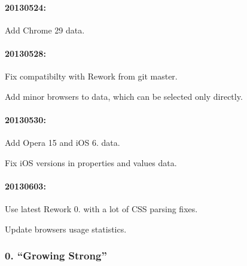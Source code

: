 \paragraph*{20130524\+:}


\begin{DoxyItemize}
\item Add Chrome 29 data.
\end{DoxyItemize}

\paragraph*{20130528\+:}


\begin{DoxyItemize}
\item Fix compatibilty with Rework from git master.
\item Add minor browsers to data, which can be selected only directly.
\end{DoxyItemize}

\paragraph*{20130530\+:}


\begin{DoxyItemize}
\item Add Opera 15 and i\+OS 6. data.
\item Fix i\+OS versions in properties and values data.
\end{DoxyItemize}

\paragraph*{20130603\+:}


\begin{DoxyItemize}
\item Use latest Rework 0. with a lot of C\+SS parsing fixes.
\item Update browsers usage statistics.
\end{DoxyItemize}

\subsubsection*{0. “\+Growing Strong”}


